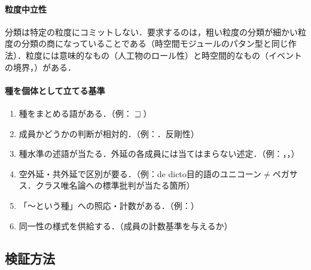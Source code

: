 \documentclass[../../main-detail.tex]{subfiles}
\begin{document}
\paragraph{粒度中立性} 分類は特定の粒度にコミットしない．要求するのは，粗い粒度の分類が細かい粒度の分類の商になっていることである（時空間モジュールのパタン型と同じ作法）．粒度には意味的なもの（人工物のロール性）と時空間的なもの（イベントの境界，\citet{tawatsuji2021}）がある．

\paragraph{種を個体として立てる基準}
\begin{enumerate}
    \item 種をまとめる語がある．（例：$\sqsupseteq$）
    \item 成員かどうかの判断が相対的．（例：．反剛性）
    \item 種水準の述語が当たる．外延の各成員には当てはまらない述定．（例：，，）
    \item 空外延・共外延で区別が要る．（例：de dicto目的語のユニコーン$\neq$ペガサス．クラス唯名論への標準批判が当たる箇所）
    \item 「〜という種」への照応・計数がある．（例：）
    \item 同一性の様式を供給する．（成員の計数基準を与えるか）
\end{enumerate}

\subsection{検証方法}
\end{document}
